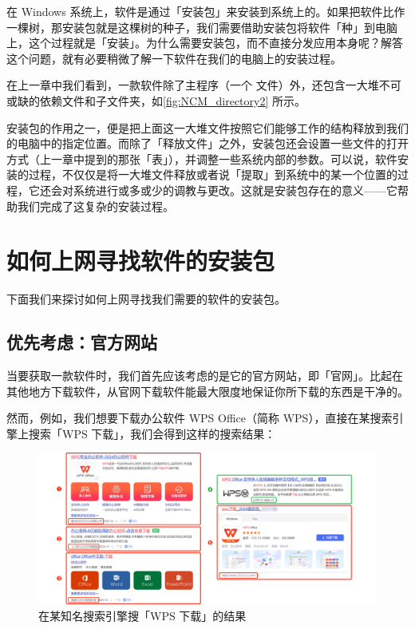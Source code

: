 在 Windows 系统上，软件是通过「安装包」来安装到系统上的。如果把软件比作一棵树，那安装包就是这棵树的种子，我们需要借助安装包将软件「种」到电脑上，这个过程就是「安装」。为什么需要安装包，而不直接分发应用本身呢？解答这个问题，就有必要稍微了解一下软件在我们的电脑上的安装过程。

在上一章中我们看到，一款软件除了主程序（一个  文件）外，还包含一大堆不可或缺的依赖文件和子文件夹，如\autoref{fig:NCM_directory2} 所示。

安装包的作用之一，便是把上面这一大堆文件按照它们能够工作的结构释放到我们的电脑中的指定位置。而除了「释放文件」之外，安装包还会设置一些文件的打开方式（上一章中提到的那张「表」），并调整一些系统内部的参数。可以说，软件安装的过程，不仅仅是将一大堆文件释放或者说「提取」到系统中的某一个位置的过程，它还会对系统进行或多或少的调教与更改。这就是安装包存在的意义——它帮助我们完成了这复杂的安装过程。

\section{如何上网寻找软件的安装包}

下面我们来探讨如何上网寻找我们需要的软件的安装包。

\subsection{优先考虑：官方网站}

当要获取一款软件时，我们首先应该考虑的是它的官方网站，即「官网」。比起在其他地方下载软件，从官网下载软件能最大限度地保证你所下载的东西是干净的。

然而，例如，我们想要下载办公软件 WPS Office（简称 WPS），直接在某搜索引擎上搜索「WPS 下载」，我们会得到这样的搜索结果：

\begin{figure}[htb!]
  \centering
  \includegraphics[width=.9\textwidth]{assets/basic/Ads_in_search_engine.pdf}
  \caption{在某知名搜索引擎搜「WPS 下载」的结果}
  \label{fig:Ads_in_search_engine}
\end{figure}

